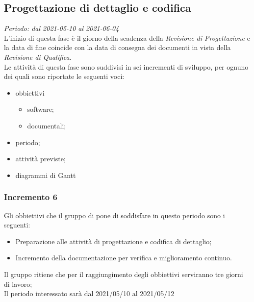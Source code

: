 \subsection{Progettazione di dettaglio e codifica}
\textit{Periodo: dal 2021-05-10 al 2021-06-04}\\
L'inizio di questa fase è il giorno della scadenza della \textit{Revisione di Progettazione} e la data di fine coincide con la data di consegna dei documenti in vista della \textit{Revisione di Qualifica}.\\
Le attività di questa fase sono suddivisi in sei incrementi di sviluppo, per ognuno dei quali sono riportate le seguenti voci:
\begin{itemize}
    \item obbiettivi
          \begin{itemize}
              \item software;
              \item documentali;
          \end{itemize}
    \item periodo;
    \item attività previste;
    \item diagrammi di Gantt
\end{itemize}


\subsubsection{Incremento 6}
Gli obbiettivi che il gruppo di pone di soddisfare in questo periodo sono i seguenti:
\begin{itemize}
    \item Preparazione alle attività di progettazione e codifica di dettaglio;
    \item Incremento della documentazione per verifica e miglioramento continuo.
\end{itemize}
Il gruppo ritiene che per il raggiungimento degli obbiettivi serviranno tre giorni di lavoro;\\
Il periodo interessato sarà dal 2021/05/10 al 2021/05/12

